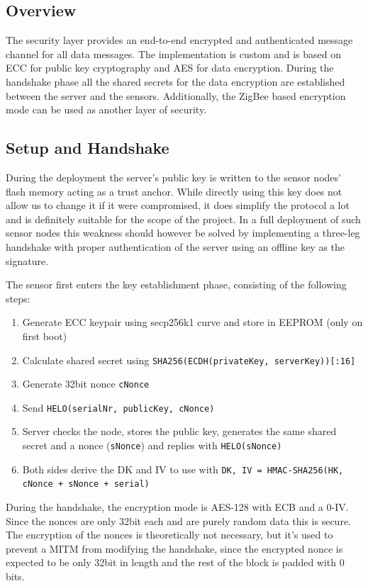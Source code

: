 \documentclass[a4paper,11pt]{scrartcl}
\begin{document}
\subsection{Overview}
The security layer provides an end-to-end encrypted and authenticated message channel for all data messages. The implementation is custom and is based on ECC for public key cryptography and AES for data encryption. During the handshake phase all the shared secrets for the data encryption are established between the server and the sensors. Additionally, the ZigBee based encryption mode can be used as another layer of security.

\subsection{Setup and Handshake}
During the deployment the server's public key is written to the sensor nodes' flash memory acting as a trust anchor. While directly using this key does not allow us to change it if it were compromised, it does simplify the protocol a lot and is definitely suitable for the scope of the project. In a full deployment of such sensor nodes this weakness should however be solved by implementing a three-leg handshake with proper authentication of the server using an offline key as the signature.

The sensor first enters the key establishment phase, consisting of the following steps:
\begin{enumerate}
\item Generate ECC keypair using secp256k1 curve and store in EEPROM (only on first boot)
\item Calculate shared secret using \texttt{SHA256(ECDH(privateKey, serverKey))[:16]}
\item Generate 32bit nonce \texttt{cNonce}
\item Send \texttt{HELO(serialNr, publicKey, {cNonce})}
\item Server checks the node, stores the public key, generates the same shared secret and a nonce (\texttt{sNonce}) and replies with \texttt{HELO({sNonce})}
\item Both sides derive the DK and IV to use with \texttt{DK, IV = HMAC-SHA256(HK,
cNonce + sNonce + serial)}
\end{enumerate}

During the handshake, the encryption mode is AES-128 with ECB and a 0-IV. Since the nonces are only 32bit each and are purely random data this is secure. The encryption of the nonces is theoretically not necessary, but it's used to prevent a MITM from modifying the handshake, since the encrypted nonce is expected to be only 32bit in length and the rest of the block is padded with 0 bits.
\end{document}
